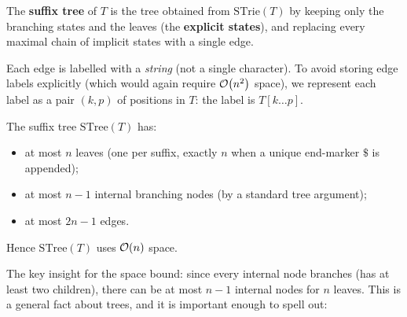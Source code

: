 \begin{definition}
  \label{def:stree}
  The \textbf{suffix tree} of $T$ is the tree obtained from
  $\mathrm{STrie}(T)$ by keeping only the branching states and the
  leaves (the \textbf{explicit states}), and replacing every maximal
  chain of implicit states with a single edge.

  Each edge is labelled with a \emph{string} (not a single character).
  To avoid storing edge labels explicitly (which would again require
  $\mathcal{O}\!\left(n^2\right)$ space), we represent each label as a pair $(k, p)$ of
  positions in $T$: the label is $T[k \ldots p]$.

  The suffix tree $\mathrm{STree}(T)$ has:
  \begin{itemize}[nosep]
    \item at most $n$ leaves (one per suffix, exactly $n$ when a unique
          end-marker $\$$ is appended);
    \item at most $n-1$ internal branching nodes (by a standard tree
          argument);
    \item at most $2n - 1$ edges.
  \end{itemize}
  Hence $\mathrm{STree}(T)$ uses $\mathcal{O}\!\left(n\right)$ space.
\end{definition}

The key insight for the space bound: since every internal node branches
(has at least two children), there can be at most $n - 1$ internal nodes
for $n$ leaves.
This is a general fact about trees, and it is important enough to spell
out:

